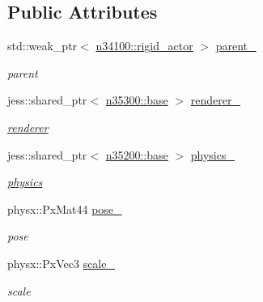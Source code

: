 \subsection*{Public Attributes}
\begin{DoxyCompactItemize}
\item 
std::weak\_\-ptr$<$ \hyperlink{classnebula_1_1content_1_1actor_1_1admin_1_1rigid__actor}{n34100::rigid\_\-actor} $>$ \hyperlink{classnebula_1_1content_1_1shape_1_1admin_1_1base_a92ffa5c28e9bafe28e7442d6d94bdb04}{parent\_\-}
\begin{DoxyCompactList}\small\item\em parent \item\end{DoxyCompactList}\item 
jess::shared\_\-ptr$<$ \hyperlink{classnebula_1_1content_1_1shape_1_1renderer_1_1base}{n35300::base} $>$ \hyperlink{classnebula_1_1content_1_1shape_1_1admin_1_1base_a4f3b558a14ae2c8f753e3201ea737383}{renderer\_\-}
\begin{DoxyCompactList}\small\item\em \hyperlink{namespacenebula_1_1content_1_1shape_1_1renderer}{renderer} \item\end{DoxyCompactList}\item 
jess::shared\_\-ptr$<$ \hyperlink{classnebula_1_1content_1_1shape_1_1physics_1_1base}{n35200::base} $>$ \hyperlink{classnebula_1_1content_1_1shape_1_1admin_1_1base_aae0ba5dbb2a6c2750589fe51d3b781a5}{physics\_\-}
\begin{DoxyCompactList}\small\item\em \hyperlink{namespacenebula_1_1content_1_1shape_1_1physics}{physics} \item\end{DoxyCompactList}\item 
physx::PxMat44 \hyperlink{classnebula_1_1content_1_1shape_1_1admin_1_1base_a990f8b017a93fb4e430fc7ab880c5f27}{pose\_\-}
\begin{DoxyCompactList}\small\item\em pose \item\end{DoxyCompactList}\item 
physx::PxVec3 \hyperlink{classnebula_1_1content_1_1shape_1_1admin_1_1base_a87478bfe3d7311d7480b5b24e5fc286b}{scale\_\-}
\begin{DoxyCompactList}\small\item\em scale \item\end{DoxyCompactList}\end{DoxyCompactItemize}


